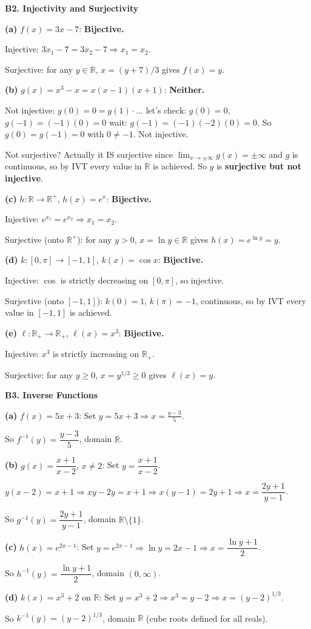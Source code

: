 \documentclass[12pt, a4paper]{article}
\theoremstyle{definition}
\newcommand{\R}{\mathbb{R}}
\begin{document}
\begin{solbox}
\textbf{B2. Injectivity and Surjectivity}

\textbf{(a)} $f(x)=3x-7$: \textbf{Bijective.}

Injective: $3x_1-7=3x_2-7 \Rightarrow x_1=x_2$. \checkmark

Surjective: for any $y\in\R$, $x=(y+7)/3$ gives $f(x)=y$. \checkmark

\textbf{(b)} $g(x)=x^3-x=x(x-1)(x+1)$: \textbf{Neither.}

Not injective: $g(0)=0=g(1) \cdot$... let's check: $g(0)=0$, $g(-1)=(-1)(0) = 0$ wait: $g(-1)=(-1)(-2)(0)=0$. So $g(0)=g(-1)=0$ with $0\neq -1$. Not injective.

Not surjective? Actually it IS surjective since $\lim_{x\to\pm\infty}g(x)=\pm\infty$ and $g$ is continuous, so by IVT every value in $\R$ is achieved. So $g$ is \textbf{surjective but not injective}.

\textbf{(c)} $h:\R\to\R^+$, $h(x)=e^x$: \textbf{Bijective.}

Injective: $e^{x_1}=e^{x_2}\Rightarrow x_1=x_2$. \checkmark

Surjective (onto $\R^+$): for any $y>0$, $x=\ln y\in\R$ gives $h(x)=e^{\ln y}=y$. \checkmark

\textbf{(d)} $k:[0,\pi]\to[-1,1]$, $k(x)=\cos x$: \textbf{Bijective.}

Injective: $\cos$ is strictly decreasing on $[0,\pi]$, so injective. \checkmark

Surjective (onto $[-1,1]$): $k(0)=1$, $k(\pi)=-1$, continuous, so by IVT every value in $[-1,1]$ is achieved. \checkmark

\textbf{(e)} $\ell:\R_+\to\R_+$, $\ell(x)=x^3$: \textbf{Bijective.}

Injective: $x^3$ is strictly increasing on $\R_+$. \checkmark

Surjective: for any $y\geq 0$, $x=y^{1/3}\geq 0$ gives $\ell(x)=y$. \checkmark
\end{solbox}

\begin{solbox}
\textbf{B3. Inverse Functions}

\textbf{(a)} $f(x)=5x+3$: Set $y=5x+3 \Rightarrow x=\frac{y-3}{5}$.

So $f^{-1}(y)=\dfrac{y-3}{5}$, domain $\R$.

\textbf{(b)} $g(x)=\dfrac{x+1}{x-2}$, $x\neq 2$: Set $y=\dfrac{x+1}{x-2}$.

$y(x-2)=x+1 \Rightarrow xy-2y=x+1 \Rightarrow x(y-1)=2y+1 \Rightarrow x=\dfrac{2y+1}{y-1}$.

So $g^{-1}(y)=\dfrac{2y+1}{y-1}$, domain $\R\setminus\{1\}$.

\textbf{(c)} $h(x)=e^{2x-1}$: Set $y=e^{2x-1} \Rightarrow \ln y = 2x-1 \Rightarrow x=\dfrac{\ln y+1}{2}$.

So $h^{-1}(y)=\dfrac{\ln y+1}{2}$, domain $(0,\infty)$.

\textbf{(d)} $k(x)=x^3+2$ on $\R$: Set $y=x^3+2 \Rightarrow x^3=y-2 \Rightarrow x=(y-2)^{1/3}$.

So $k^{-1}(y)=(y-2)^{1/3}$, domain $\R$ (cube roots defined for all reals).
\end{solbox}
\end{document}
